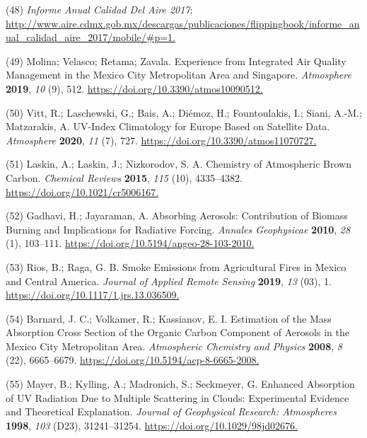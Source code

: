 \documentclass[10pt]{article}
\begin{document}
\label{csl:48}(48) \textit{{Informe Anual Calidad Del Aire 2017}}; \url{http://www.aire.cdmx.gob.mx/descargas/publicaciones/flippingbook/informe_anual_calidad_aire_2017/mobile/#p=1.}

\label{csl:49}(49) Molina; Velasco; Retama; Zavala. {Experience from Integrated Air Quality Management in the Mexico City Metropolitan Area and Singapore}. \textit{Atmosphere} \textbf{2019}, \textit{10} (9), 512. \url{https://doi.org/10.3390/atmos10090512.}

\label{csl:50}(50) Vitt, R.; Laschewski, G.; Bais, A.; Di{\'{e}}moz, H.; Fountoulakis, I.; Siani, A.-M.; Matzarakis, A. {{UV}-Index Climatology for Europe Based on Satellite Data}. \textit{Atmosphere} \textbf{2020}, \textit{11} (7), 727. \url{https://doi.org/10.3390/atmos11070727.}

\label{csl:51}(51) Laskin, A.; Laskin, J.; Nizkorodov, S. A. {Chemistry of Atmospheric Brown Carbon}. \textit{Chemical Reviews} \textbf{2015}, \textit{115} (10), 4335–4382. \url{https://doi.org/10.1021/cr5006167.}

\label{csl:52}(52) Gadhavi, H.; Jayaraman, A. {Absorbing Aerosols: Contribution of Biomass Burning and Implications for Radiative Forcing}. \textit{Annales Geophysicae} \textbf{2010}, \textit{28} (1), 103–111. \url{https://doi.org/10.5194/angeo-28-103-2010.}

\label{csl:53}(53) Rios, B.; Raga, G. B. {Smoke Emissions from Agricultural Fires in Mexico and Central America}. \textit{Journal of Applied Remote Sensing} \textbf{2019}, \textit{13} (03), 1. \url{https://doi.org/10.1117/1.jrs.13.036509.}

\label{csl:54}(54) Barnard, J. C.; Volkamer, R.; Kassianov, E. I. {Estimation of the Mass Absorption Cross Section of the Organic Carbon Component of Aerosols in the Mexico City Metropolitan Area}. \textit{Atmospheric Chemistry and Physics} \textbf{2008}, \textit{8} (22), 6665–6679. \url{https://doi.org/10.5194/acp-8-6665-2008.}

\label{csl:55}(55) Mayer, B.; Kylling, A.; Madronich, S.; Seckmeyer, G. {Enhanced Absorption of {UV} Radiation Due to Multiple Scattering in Clouds: Experimental Evidence and Theoretical Explanation}. \textit{Journal of Geophysical Research: Atmospheres} \textbf{1998}, \textit{103} (D23), 31241–31254. \url{https://doi.org/10.1029/98jd02676.}
\end{document}
